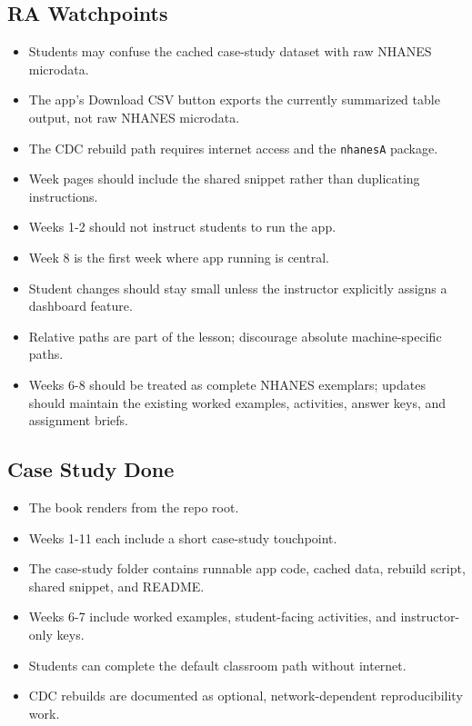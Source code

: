\documentclass[
  letterpaper,
  DIV=11,
  numbers=noendperiod,
  oneside]{scrreprt}
\providecommand{\tightlist}{%
  \setlength{\itemsep}{0pt}\setlength{\parskip}{0pt}}
\begin{document}
\subsection*{RA Watchpoints}\label{ra-watchpoints}

\begin{itemize}
\tightlist
\item
  Students may confuse the cached case-study dataset with raw NHANES
  microdata.
\item
  The app's Download CSV button exports the currently summarized table
  output, not raw NHANES microdata.
\item
  The CDC rebuild path requires internet access and the \texttt{nhanesA}
  package.
\item
  Week pages should include the shared snippet rather than duplicating
  instructions.
\item
  Weeks 1-2 should not instruct students to run the app.
\item
  Week 8 is the first week where app running is central.
\item
  Student changes should stay small unless the instructor explicitly
  assigns a dashboard feature.
\item
  Relative paths are part of the lesson; discourage absolute
  machine-specific paths.
\item
  Weeks 6-8 should be treated as complete NHANES exemplars; updates
  should maintain the existing worked examples, activities, answer keys,
  and assignment briefs.
\end{itemize}

\subsection*{Case Study Done}\label{case-study-done}

\begin{itemize}
\tightlist
\item
  The book renders from the repo root.
\item
  Weeks 1-11 each include a short case-study touchpoint.
\item
  The case-study folder contains runnable app code, cached data, rebuild
  script, shared snippet, and README.
\item
  Weeks 6-7 include worked examples, student-facing activities, and
  instructor-only keys.
\item
  Students can complete the default classroom path without internet.
\item
  CDC rebuilds are documented as optional, network-dependent
  reproducibility work.
\end{itemize}
\end{document}
